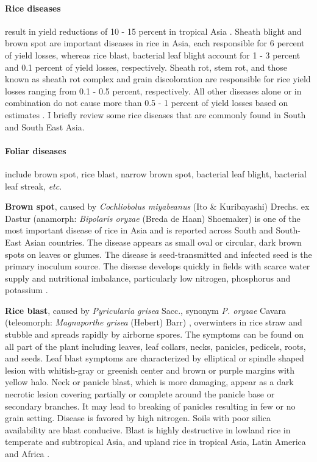 \paragraph{Rice diseases} result in yield reductions of 10 - 15 percent in tropical Asia \citep{Willocquet_2004_Research}. Sheath blight and brown spot are important diseases in rice in Asia, each responsible for 6 percent of yield losses, whereas rice blast, bacterial leaf blight account for 1 - 3 percent and 0.1 percent of yield losses, respectively. Sheath rot, stem rot, and those known as sheath rot complex and grain discoloration are responsible for rice yield losses ranging from 0.1 - 0.5 percent, respectively. All other diseases alone or in combination do not cause more than 0.5 - 1 percent of yield losses based on estimates \citep{Savary_2000_Quantification,Mew_2002_Handbook}. I briefly review some rice diseases that are commonly found in South and South East Asia. 

\paragraph{Foliar diseases} include brown spot, rice blast, narrow brown spot, bacterial leaf blight, bacterial leaf streak, \textit{etc}.

\textbf{Brown spot}, caused by \textit{Cochliobolus miyabeanus} (Ito \& Kuribayashi) Drechs. ex Dastur (anamorph: \textit{Bipolaris oryzae} (Breda de Haan) Shoemaker) is one of the most important disease of rice in Asia and is reported across South and South-East Asian countries. The disease appears as small oval or circular, dark brown spots on leaves or glumes. The disease is seed-transmitted and infected seed is the primary inoculum source. The disease develops quickly in fields with scarce water supply and nutritional imbalance, particularly low nitrogen, phosphorus and potassium \citep{Barnwal_2013_Review}.

\textbf{Rice blast}, caused by \textit{Pyricularia grisea} Sacc., synonym \textit{P. oryzae} Cavara (teleomorph: \textit{Magnaporthe grisea} (Hebert) Barr) \citep{Rossman_1990_Pyricularia}, overwinters in rice straw and stubble and spreads rapidly by airborne spores. The symptoms can be found on all part of the plant including leaves, leaf collars, necks, panicles, pedicels, roots, and seeds. Leaf blast symptoms are characterized by elliptical or spindle shaped lesion with whitish-gray or greenish center and brown or purple margins with yellow halo. Neck or panicle blast, which is more damaging, appear as a dark necrotic lesion covering partially or complete around the panicle base or secondary branches. It may lead to breaking of panicles resulting in few or no grain setting. Disease is favored by high nitrogen. Soils with poor silica availability are blast conducive. Blast is highly destructive in lowland rice in temperate and subtropical Asia, and upland rice in tropical Asia, Latin America and Africa \citep{Ou_1985_Rice}.

